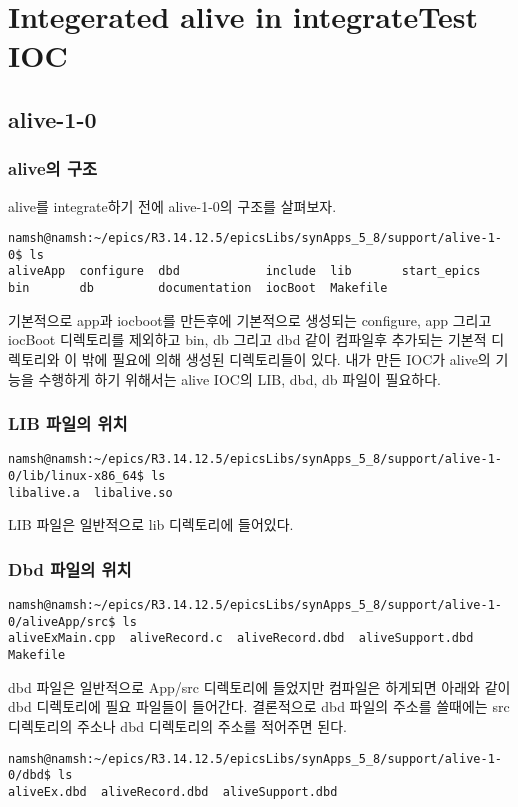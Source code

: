 \documentclass[11pt
  , a4paper
  , article
  , oneside
]{memoir}
\begin{document}
\chapter{Integerated alive in integrateTest IOC}
\section{alive-1-0}
\subsection{alive의 구조}
alive를 integrate하기 전에 alive-1-0의 구조를 살펴보자.
\begin{lstlisting}[style=termstyle]
namsh@namsh:~/epics/R3.14.12.5/epicsLibs/synApps_5_8/support/alive-1-0$ ls
aliveApp  configure  dbd            include  lib       start_epics
bin       db         documentation  iocBoot  Makefile
\end{lstlisting}
기본적으로 app과 iocboot를 만든후에 기본적으로 생성되는 configure, app 그리고 iocBoot 디렉토리를 제외하고 bin, db 그리고 dbd 같이 컴파일후 추가되는 기본적 디렉토리와 이 밖에 필요에 의해 생성된 디렉토리들이 있다.
내가 만든 IOC가 alive의 기능을 수행하게 하기 위해서는 alive IOC의 LIB, dbd, db 파일이 필요하다.

\subsection{LIB 파일의 위치}
\begin{lstlisting}[style=termstyle]
namsh@namsh:~/epics/R3.14.12.5/epicsLibs/synApps_5_8/support/alive-1-0/lib/linux-x86_64$ ls
libalive.a  libalive.so
\end{lstlisting}
LIB 파일은 일반적으로 lib 디렉토리에 들어있다.
\subsection{Dbd 파일의 위치}
\begin{lstlisting}[style=termstyle]
namsh@namsh:~/epics/R3.14.12.5/epicsLibs/synApps_5_8/support/alive-1-0/aliveApp/src$ ls
aliveExMain.cpp  aliveRecord.c  aliveRecord.dbd  aliveSupport.dbd  Makefile
\end{lstlisting}
dbd 파일은 일반적으로 App/src 디렉토리에 들었지만 컴파일은 하게되면 아래와 같이 dbd 디렉토리에 필요 파일들이 들어간다. 결론적으로 dbd 파일의 주소를 쓸때에는 src 디렉토리의 주소나 dbd 디렉토리의 주소를 적어주면 된다.
\begin{lstlisting}[style=termstyle]
namsh@namsh:~/epics/R3.14.12.5/epicsLibs/synApps_5_8/support/alive-1-0/dbd$ ls
aliveEx.dbd  aliveRecord.dbd  aliveSupport.dbd
\end{lstlisting}
\end{document}
